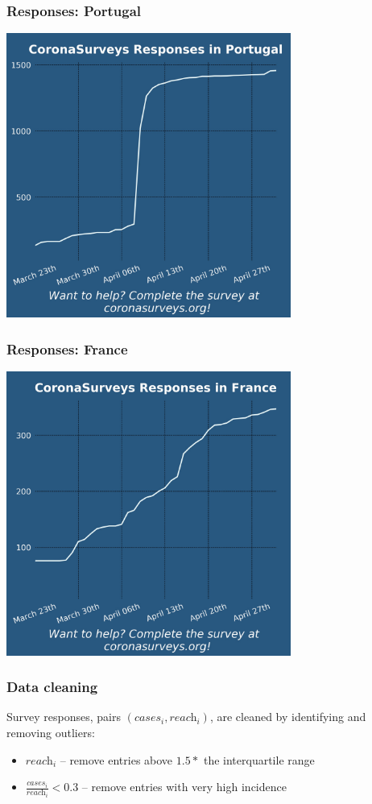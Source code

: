 \documentclass{beamer}
\begin{document}
\begin{frame}
  \frametitle{Responses: Portugal}
  \begin{center}
  \includegraphics[width=0.7\textwidth]{responses-PT.jpg}
  \end{center}
\end{frame}


\begin{frame}
  \frametitle{Responses: France}
  \begin{center}
  \includegraphics[width=0.7\textwidth]{responses-FR.jpg}
  \end{center}
\end{frame}

\begin{frame}
  \frametitle{Data cleaning}
  Survey responses, pairs  $(\textit{cases}_i,\textit{reach}_i)$, are cleaned by identifying and removing outliers: 
  \begin{itemize}
    \item $\textit{reach}_i$ \--- remove entries above $1.5 *$  the  interquartile  range
    \item $\frac{\textit{cases}_i}{\textit{reach}_i} < 0.3$ \--- remove entries with very high incidence
  \end{itemize}



\end{frame}
\end{document}
